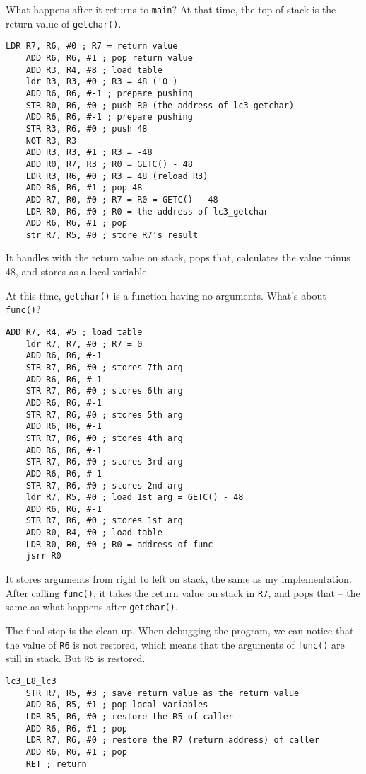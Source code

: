 \documentclass{article}
\begin{document}
	What happens after it returns to \texttt{main}? At that time, the top of stack is the return value of \texttt{getchar()}.
	
	\begin{lstlisting}[caption={Things after \texttt{getchar()}, with comments}]
	LDR R7, R6, #0 ; R7 = return value
	ADD R6, R6, #1 ; pop return value
	ADD R3, R4, #8 ; load table
	ldr R3, R3, #0 ; R3 = 48 ('0')
	ADD R6, R6, #-1 ; prepare pushing
	STR R0, R6, #0 ; push R0 (the address of lc3_getchar)
	ADD R6, R6, #-1 ; prepare pushing
	STR R3, R6, #0 ; push 48
	NOT R3, R3
	ADD R3, R3, #1 ; R3 = -48
	ADD R0, R7, R3 ; R0 = GETC() - 48
	LDR R3, R6, #0 ; R3 = 48 (reload R3)
	ADD R6, R6, #1 ; pop 48
	ADD R7, R0, #0 ; R7 = R0 = GETC() - 48
	LDR R0, R6, #0 ; R0 = the address of lc3_getchar
	ADD R6, R6, #1 ; pop 
	str R7, R5, #0 ; store R7's result
	\end{lstlisting}
	
	It handles with the return value on stack, pops that, calculates the value minus 48, and stores as a local variable.
	
	At this time, \texttt{getchar()} is a function having no arguments. What's about \texttt{func()}?
	
	\begin{lstlisting}[caption={Calling \texttt{func()}, a function with many arguments}]
	ADD R7, R4, #5 ; load table
	ldr R7, R7, #0 ; R7 = 0
	ADD R6, R6, #-1
	STR R7, R6, #0 ; stores 7th arg
	ADD R6, R6, #-1
	STR R7, R6, #0 ; stores 6th arg
	ADD R6, R6, #-1
	STR R7, R6, #0 ; stores 5th arg
	ADD R6, R6, #-1
	STR R7, R6, #0 ; stores 4th arg
	ADD R6, R6, #-1
	STR R7, R6, #0 ; stores 3rd arg
	ADD R6, R6, #-1
	STR R7, R6, #0 ; stores 2nd arg
	ldr R7, R5, #0 ; load 1st arg = GETC() - 48
	ADD R6, R6, #-1
	STR R7, R6, #0 ; stores 1st arg
	ADD R0, R4, #0 ; load table
	LDR R0, R0, #0 ; R0 = address of func
	jsrr R0
	\end{lstlisting}
	
	It stores arguments from right to left on stack, the same as my implementation. After calling \texttt{func()}, it takes the return value on stack in \texttt{R7}, and pops that -- the same as what happens after \texttt{getchar()}.
	
	The final step is the clean-up. When debugging the program, we can notice that the value of \texttt{R6} is not restored, which means that the arguments of \texttt{func()} are still in stack. But \texttt{R5} is restored.
	
	\begin{lstlisting}[caption={Before returning from \texttt{main()}}]
	lc3_L8_lc3
	STR R7, R5, #3 ; save return value as the return value
	ADD R6, R5, #1 ; pop local variables
	LDR R5, R6, #0 ; restore the R5 of caller
	ADD R6, R6, #1 ; pop
	LDR R7, R6, #0 ; restore the R7 (return address) of caller
	ADD R6, R6, #1 ; pop
	RET ; return
	\end{lstlisting}
	
\end{document}
